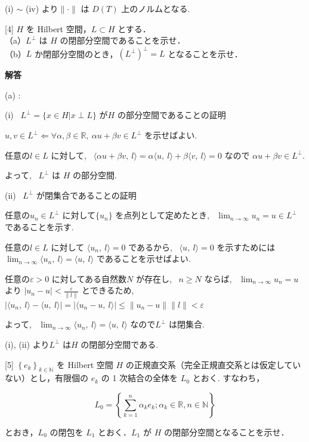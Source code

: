 \documentclass{jsarticle}
\begin{document}
(i) $\sim$ (iv) より$\|\cdot\|$ は $D(T)$ 上のノルムとなる.
 

\bigskip
\bigskip

\begin{itembox}[l]{[4]}
  $H$ を Hilbert 空間，$L \subset H$ とする．\\
（a）$L^{\perp}$ は $H$ の閉部分空間であることを示せ．\\
（b）$L$ か閉部分空間のとき，$\left(L^{\perp}\right)^{\perp}=L$ となることを示せ．
\end{itembox}

\textbf{解答}

(a) :

(i) \ $L^{\perp} = \{x \in H | x \perp L\}$ が$H$ の部分空間であることの証明

$u, v \in L^{\perp} \Longleftarrow \forall \alpha, \beta \in \mathbb{R}, \ \alpha u + \beta v \in L^{\perp}$ を示せばよい.

任意の$l \in L$ に対して, \ $\langle \alpha u + \beta v, \ l \rangle = \alpha \langle u, \ l \rangle + \beta \langle v, \ l \rangle = 0$ なので $\alpha u + \beta v \in L^{\perp}$.

よって, \ $L^{\perp}$ は $H$ の部分空間.

\bigskip

(ii) \ $L^{\perp}$ が閉集合であることの証明

任意の$u_n \in L^{\perp}$ に対して$\{u_n\}$ を点列として定めたとき, \ $\displaystyle \lim_{n \to \infty} u_n = u \in L^{\perp}$ であることを示す. 

任意の$l \in L$ に対して $\langle u_n, \ l \rangle = 0$ であるから, \ $\langle u, \ l \rangle = 0$ を示すためには$\displaystyle \lim_{n \to \infty} \langle u_n, \ l \rangle = \langle u, \ l \rangle$ であることを示せばよい.

任意の$\varepsilon > 0$ に対してある自然数$N$ が存在し, \ $n \ge N$ ならば, \ $\displaystyle \lim_{n \to \infty} u_n = u$ より $|u_n - u| < \frac{\varepsilon}{\|l\|}$ とできるため, \ 
$|\langle u_n, \ l \rangle - \langle u, \ l \rangle | 
= |\langle u_n - u, \ l \rangle |
\le \|u_n - u\| \|l\|
< \varepsilon$

よって, \ $\displaystyle \lim_{n \to \infty} \langle u_n, \ l \rangle = \langle u, \ l \rangle$ なので$L^{\perp}$ は閉集合.

(i), (ii) より$L^{\perp}$ は$H$ の閉部分空間である.

\bigskip
\bigskip


\bigskip
\bigskip

\begin{itembox}[l]{[5]}
$\left\{e_{k}\right\}_{k \in \mathbb{N}}$ を Hilbert 空間 $H$ の正規直交系（完全正規直交系とは仮定していない）とし，有限個の $e_{k}$ の 1 次結合の全体を $L_{0}$ とおく. すなわち，

$$
L_{0}=\left\{\sum_{k=1}^{n} \alpha_{k} e_{k} ; \alpha_{k} \in \mathbb{R}, n \in \mathbb{N}\right\}
$$

とおき，$L_{0}$ の閉包を $L_{1}$ とおく．$L_{1}$ が $H$ の閉部分空間となることを示せ．
\end{itembox}
\end{document}
